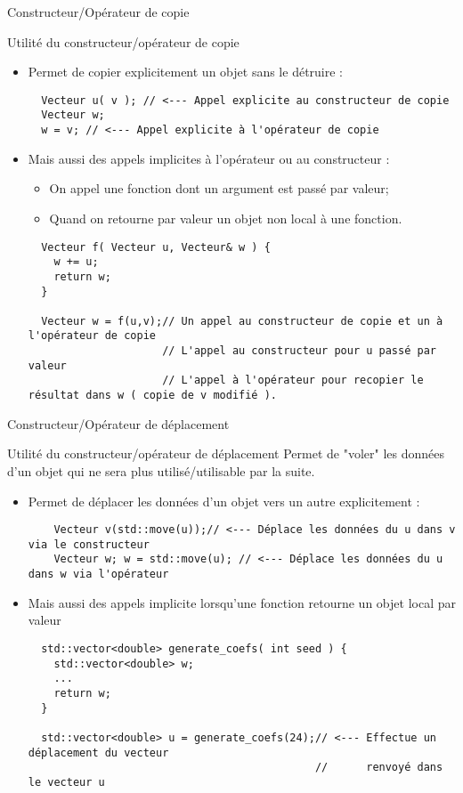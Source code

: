 \documentclass[compress,10pt,aspectratio=169]{beamer}
\begin{document}
  \begin{frame}[fragile]{Constructeur/Opérateur de copie}
  \scriptsize
  \begin{block}{\small Utilité du constructeur/opérateur de copie}
  \begin{itemize}
    \item Permet de copier explicitement un objet sans le détruire :
    \begin{verbatim}
  Vecteur u( v ); // <--- Appel explicite au constructeur de copie
  Vecteur w;
  w = v; // <--- Appel explicite à l'opérateur de copie
  \end{verbatim}
  \item Mais aussi des appels implicites à l'opérateur ou au constructeur :
  \begin{itemize}
  \scriptsize
  \item On appel une fonction dont un argument est passé par valeur;
  \item Quand on retourne par valeur un objet non local à une fonction.
  \end{itemize}
  \begin{verbatim}
  Vecteur f( Vecteur u, Vecteur& w ) {
    w += u;
    return w;
  }
    
  Vecteur w = f(u,v);// Un appel au constructeur de copie et un à l'opérateur de copie
                     // L'appel au constructeur pour u passé par valeur
                     // L'appel à l'opérateur pour recopier le résultat dans w ( copie de v modifié ).
  \end{verbatim}
  \end{itemize}
  \end{block}
  \end{frame}
    
  \begin{frame}[fragile]{Constructeur/Opérateur de déplacement}
  \scriptsize
  \begin{block}{\small Utilité du constructeur/opérateur de déplacement}
  Permet de "voler" les données d'un objet qui ne sera plus utilisé/utilisable par la suite.
  \begin{itemize}
    \item Permet de déplacer les données d'un objet vers un autre explicitement :
    \begin{verbatim}
    Vecteur v(std::move(u));// <--- Déplace les données du u dans v via le constructeur
    Vecteur w; w = std::move(u); // <--- Déplace les données du u dans w via l'opérateur
    \end{verbatim}
    \item Mais aussi des appels implicite lorsqu'une fonction retourne un objet local par valeur
    \begin{verbatim}
  std::vector<double> generate_coefs( int seed ) {
    std::vector<double> w;
    ...
    return w;
  }
    
  std::vector<double> u = generate_coefs(24);// <--- Effectue un déplacement du vecteur 
                                             //      renvoyé dans le vecteur u
  \end{verbatim}
  \end{itemize}
  \end{block}
  \end{frame}
    
\end{document}
